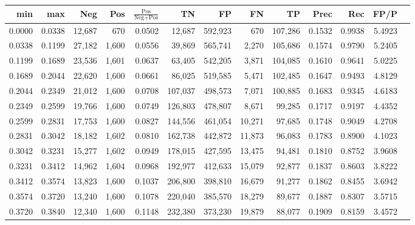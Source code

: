 \begin{tabular}{rrrrrrrrrrrrr}
\toprule
   min &    max &    Neg &   Pos & $\frac{\text{Pos}}{\text{Neg}+\text{Pos}}$ &      TN &      FP &      FN &      TP &   Prec &    Rec &   FP/P \\
\midrule
0.0000 & 0.0338 & 12,687 &   670 &                                     0.0502 &  12,687 & 592,923 &     670 & 107,286 & 0.1532 & 0.9938 & 5.4923 \\
0.0338 & 0.1199 & 27,182 & 1,600 &                                     0.0556 &  39,869 & 565,741 &   2,270 & 105,686 & 0.1574 & 0.9790 & 5.2405 \\
0.1199 & 0.1689 & 23,536 & 1,601 &                                     0.0637 &  63,405 & 542,205 &   3,871 & 104,085 & 0.1610 & 0.9641 & 5.0225 \\
0.1689 & 0.2044 & 22,620 & 1,600 &                                     0.0661 &  86,025 & 519,585 &   5,471 & 102,485 & 0.1647 & 0.9493 & 4.8129 \\
0.2044 & 0.2349 & 21,012 & 1,600 &                                     0.0708 & 107,037 & 498,573 &   7,071 & 100,885 & 0.1683 & 0.9345 & 4.6183 \\
0.2349 & 0.2599 & 19,766 & 1,600 &                                     0.0749 & 126,803 & 478,807 &   8,671 &  99,285 & 0.1717 & 0.9197 & 4.4352 \\
0.2599 & 0.2831 & 17,753 & 1,600 &                                     0.0827 & 144,556 & 461,054 &  10,271 &  97,685 & 0.1748 & 0.9049 & 4.2708 \\
0.2831 & 0.3042 & 18,182 & 1,602 &                                     0.0810 & 162,738 & 442,872 &  11,873 &  96,083 & 0.1783 & 0.8900 & 4.1023 \\
0.3042 & 0.3231 & 15,277 & 1,602 &                                     0.0949 & 178,015 & 427,595 &  13,475 &  94,481 & 0.1810 & 0.8752 & 3.9608 \\
0.3231 & 0.3412 & 14,962 & 1,604 &                                     0.0968 & 192,977 & 412,633 &  15,079 &  92,877 & 0.1837 & 0.8603 & 3.8222 \\
0.3412 & 0.3574 & 13,823 & 1,600 &                                     0.1037 & 206,800 & 398,810 &  16,679 &  91,277 & 0.1862 & 0.8455 & 3.6942 \\
0.3574 & 0.3720 & 13,240 & 1,600 &                                     0.1078 & 220,040 & 385,570 &  18,279 &  89,677 & 0.1887 & 0.8307 & 3.5715 \\
0.3720 & 0.3840 & 12,340 & 1,600 &                                     0.1148 & 232,380 & 373,230 &  19,879 &  88,077 & 0.1909 & 0.8159 & 3.4572 \\

\end{tabular}
